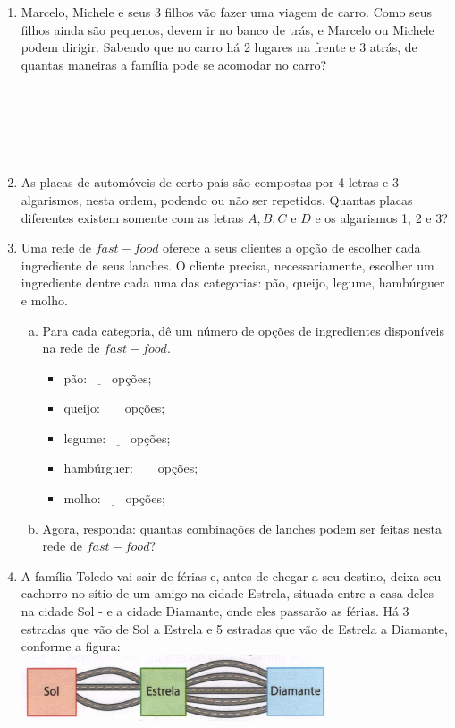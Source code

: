 \documentclass[a4paper,14pt]{article}
\begin{document}
\begin{multicols}{2}
\begin{enumerate}
			\item Marcelo, Michele e seus 3 filhos vão fazer uma viagem de carro. Como seus filhos ainda são pequenos, devem ir no banco de trás, e Marcelo ou Michele podem dirigir. Sabendo que no carro há 2 lugares na frente e 3 atrás, de quantas maneiras a família pode se acomodar no carro? \\\\\\\\\\\\
			\item As placas de automóveis de certo país são compostas por 4 letras e 3 algarismos, nesta ordem, podendo ou não ser repetidos. Quantas placas diferentes existem somente com as letras $A, B, C$ e $D$ e os algarismos 1, 2 e 3? \columnbreak
			\item Uma rede de $fast-food$ oferece a seus clientes a opção de escolher cada ingrediente de seus lanches. O cliente precisa, necessariamente, escolher um ingrediente dentre cada uma das categorias: pão, queijo, legume, hambúrguer e molho.
			\begin{enumerate}[a)]
				\item Para cada categoria, dê um número de opções de ingredientes disponíveis na rede de $fast-food$.
				\begin{itemize}
					\item pão: $\underline{~~~~~~}$ opções;
					\item queijo: $\underline{~~~~~~}$ opções;
					\item legume: $\underline{~~~~~~}$ opções;
					\item hambúrguer: $\underline{~~~~~~}$ opções;
					\item molho: $\underline{~~~~~~}$ opções;
				\end{itemize}
				\item Agora, responda: quantas combinações de lanches podem ser feitas nesta rede de $fast-food$? \newpage
			\end{enumerate}
			\item A família Toledo vai sair de férias e, antes de chegar a seu destino, deixa seu cachorro no sítio de um amigo na cidade Estrela, situada entre a casa deles - na cidade Sol - e a cidade Diamante, onde eles passarão as férias. Há 3 estradas que vão de Sol a Estrela e 5 estradas que vão de Estrela a Diamante, conforme a figura: \\
			\includegraphics[width=1\linewidth]{6FMA112_imagens/imagem1}

\end{enumerate}
\end{multicols}
\end{document}
